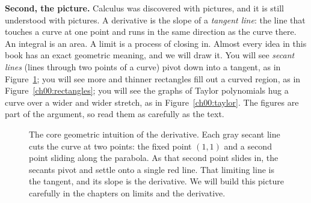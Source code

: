 \textbf{Second, the picture.} Calculus was discovered with pictures, and it is still understood with
pictures. A derivative is the slope of a \emph{tangent line}: the line that touches a curve at one
point and runs in the same direction as the curve there. An integral is an area. A limit is a process
of closing in. Almost every idea in this book has an exact geometric meaning, and we will draw it.
You will see \emph{secant lines} (lines through two points of a curve) pivot down into a tangent, as
in Figure~\ref{ch00:secant-tangent}; you will see more and thinner rectangles fill out a curved
region, as in Figure~\ref{ch00:rectangles}; you will see the graphs of Taylor polynomials hug a curve
over a wider and wider stretch, as in Figure~\ref{ch00:taylor}. The figures are part of the argument, so read them as carefully as
the text.

\begin{figure}[htbp]
\centering
{}
\caption{The core geometric intuition of the derivative. Each gray secant line cuts the curve at two points: the fixed point $(1,1)$ and a second point sliding along the parabola. As that second point slides in, the secants pivot and settle onto a single red line. That limiting line is the tangent, and its slope is the derivative. We will build this picture carefully in the chapters on limits and the derivative.}
\label{ch00:secant-tangent}
\end{figure}

